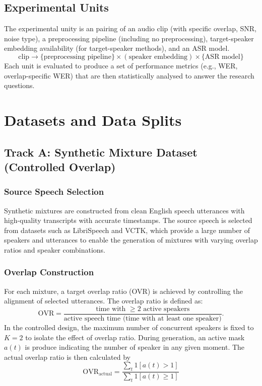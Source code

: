 \subsection{Experimental Units}
The experimental unity is an pairing of an audio clip (with specific overlap, SNR, noise type), a preprocessing pipeline (including no preprocessing), target-speaker embedding availability (for target-speaker methods), and an ASR model. 
\begin{equation}
\text{clip} \to \{\text{preprocessing pipeline}\}\times (\text{speaker embedding}) \times\{\text{ASR model}\}\end{equation}
Each unit is evaluated to produce a set of performance metrics (e.g., WER, overlap-specific WER) that are then statistically analysed to answer the research questions.





\section{Datasets and Data Splits}
\subsection{Track A: Synthetic Mixture Dataset (Controlled Overlap)}
\subsubsection{Source Speech Selection}
Synthetic mixtures are constructed from clean English speech utterances with high-quality transcripts with accurate timestamps. The source speech is selected from datasets such as LibriSpeech and VCTK, which provide a large number of speakers and utterances to enable the generation of mixtures with varying overlap ratios and speaker combinations.

\subsubsection{Overlap Construction}
For each mixture, a target overlap ratio (OVR) is achieved by controlling the alignment of selected utterances. The overlap ratio is defined as:
\begin{equation}
\mathrm{OVR} = \frac{\text{time with $\geq 2$ active speakers}}{\text{active speech time (time with at least one speaker)}}.
\end{equation}
In the controlled design, the maximum number of concurrent speakers is fixed to $K=2$ to isolate the effect of overlap ratio. During generation, an active mask $a(t)$ is produce indicating the number of speaker in any given moment. The actual overlap ratio is then calculated by
\begin{equation}
\mathrm{OVR}_\text{actual}=\frac{\sum_t 1[a(t) > 1]}{\sum_t 1[a(t) \ge 1]} 
\end{equation}

